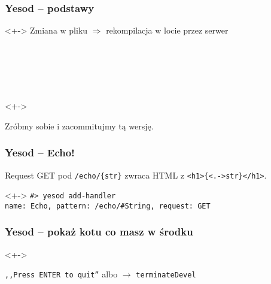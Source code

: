 \documentclass[landscape]{beamer}
\begin{document}
\begin{frame}
  \frametitle{Yesod -- podstawy}
  \begin{uncoverenv}<+->
    Zmiana w pliku $\Rightarrow$ rekompilacja w locie przez serwer
  \end{uncoverenv}

  \begin{center}
     \\
     \\
     \\
     \\
  \end{center}

  \begin{uncoverenv}<+->
    \begin{center}
      Zr\'obmy sobie  i zacommitujmy t\k{a} wersj\k{e}.
    \end{center}
  \end{uncoverenv}
\end{frame}

\begin{frame}
  \frametitle{Yesod -- Echo!}

  Request GET pod \texttt{/echo/\{\alert<+->{str}\}} zwraca HTML z
  \texttt{<h1>\{\alert<.->{str}\}</h1>}.

  \begin{uncoverenv}<+->
    \texttt{\#> yesod add-handler} \\
    \texttt{name: Echo, pattern: /echo/\#String, request: GET}
  \end{uncoverenv}

\end{frame}

\begin{frame}
  \frametitle{Yesod -- poka\.z kotu co masz w \'srodku}
  
  \begin{uncoverenv}<+->
    \begin{center}
      \texttt{,,Press ENTER to quit''}
      albo
      {}
      $\rightarrow$ \texttt{terminateDevel}
    \end{center}
  \end{uncoverenv}

  \uncover<+->{}
\end{frame}
\end{document}
